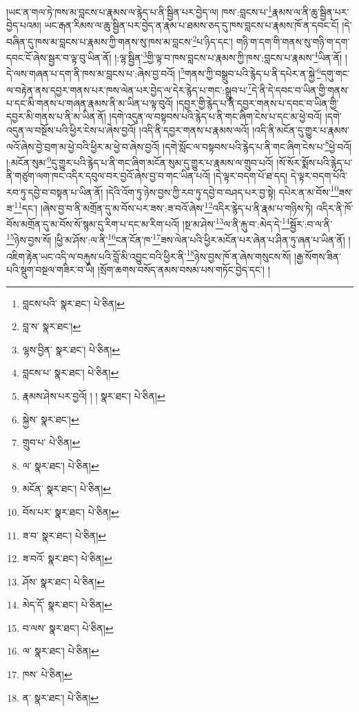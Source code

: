 །ཡང་ན་གལ་ཏེ་ཁས་མ་བླངས་པ་རྣམས་ལ་རྙེད་པ་ནི་སྦྱིན་པར་བྱེད་ལ། ཁས་:བླངས་པ་\footnote{བླངས་པའི་  སྣར་ཐང་།  པེ་ཅིན། }རྣམས་ལ་ནི་ཆུ་སྦྱིན་པར་བྱེད་པའམ། ཡང་རྒན་རིམས་ལ་ཆུ་སྦྱིན་པར་བྱེད་ན་རྣམ་པ་ཐམས་ཅད་དུ་ཁས་བླངས་པ་རྣམས་ཁོ་ན་དབང་ངོ། །དེ་བཞིན་དུ་ཁས་མ་བླངས་པ་རྣམས་ཀྱི་གནས་སུ་ཁས་མ་བླངས་\footnote{བླ་ས་  སྣར་ཐང་། }པ་ཉིད་དང་། གཉི་ག་དག་གི་གནས་སུ་གཉི་ག་དག་དབང་ངོ་ཞེས་སྦྱར་བ་ལྟ་བུ་ཡིན་ནོ། །:ལྷ་སྦྱིན་\footnote{ལྷས་བྱིན་  སྣར་ཐང་།  པེ་ཅིན། }གྱི་ལྟ་བ་ཁས་བླངས་པ་རྣམས་ཀྱི་ཁས་:བླངས་པ་རྣམས་\footnote{བླངས་པ་  སྣར་ཐང་།  པེ་ཅིན། }ཡིན་ནོ། །དེ་ལས་གཞན་པ་དག་ནི་ཁས་མ་བླངས་པ་:ཞེས་བྱ་བའོ། །\footnote{རྣམས་ཤེས་པར་བྱའོ། ། །  སྣར་ཐང་།  པེ་ཅིན། }གནས་ཀྱི་བསྒྲུབ་པའི་རྙེད་པ་ནི་དཔེར་ན་སྐྱེ་\footnote{སྐྱེས་  སྣར་ཐང་། }དགུ་གང་ལ་བརྟེན་ནས་དབྱར་གནས་པར་ཁས་ལེན་པར་བྱེད་ལ་དེར་རྙེད་པ་གང་:སྒྲུབ་པ་\footnote{གྲུབ་པ་  པེ་ཅིན། }དེ་ནི་དེ་དབང་བ་ཡིན་གྱི་གནས་པ་དང་མི་གནས་པ་གཞན་རྣམས་ནི་མ་ཡིན་པ་ལྟ་བུའོ། །དབྱར་གྱི་རྙེད་པ་ནི་དབྱར་གནས་པ་དབང་བ་ཡིན་གྱི་དབྱར་མི་གནས་པ་ནི་མ་ཡིན་ནོ། །དགེ་འདུན་ལ་བསྟབས་པའི་རྙེད་པ་ནི་གང་ཞིག་ངེས་པ་དང་མ་ཕྱེ་བའོ། །དགེ་འདུན་ལ་བསྔོས་པའི་ཕྱིར་ངེས་པ་ཞེས་བྱའོ། །འདི་ནི་དབྱར་གནས་པ་རྣམས་ལའོ། །འདི་ནི་མངོན་དུ་གྱུར་པ་རྣམས་ལའོ་ཞེས་བྱེ་བྲག་མ་ཕྱེ་བའི་ཕྱིར་མ་ཕྱེ་བ་ཞེས་བྱའོ། །དགེ་སློང་ལ་བསྟབས་པའི་རྙེད་པ་ནི་གང་ཞིག་ངེས་པ་\footnote{ལ་  སྣར་ཐང་།  པེ་ཅིན། }ཕྱེ་བའོ། །:མངོན་སུམ་\footnote{མངོན་  སྣར་ཐང་།  པེ་ཅིན། }དུ་གྱུར་པའི་རྙེད་པ་ནི་གང་ཞིག་མངོན་སུམ་དུ་གྱུར་པ་རྣམས་ལ་གྲུབ་པའོ། །སོ་སོར་སྨོས་པའི་རྙེད་པ་ནི་གཙུག་ལག་ཁང་འདིར་དབུལ་བར་བྱའོ་ཞེས་བྱ་བ་གང་ཡིན་པའོ། །དེ་ལྟར་བདག་པོ་ཐ་དད། དེ་ལྟར་བདག་པོའི་རབ་ཏུ་དབྱེ་བ་བསྟན་པ་ཡིན་ནོ། །དེའི་འོག་ཏུ་ཉེས་བྱས་ཀྱི་རབ་ཏུ་དབྱེ་བ་བཤད་པར་བྱ་སྟེ། དཔེར་ན་མ་བོས་\footnote{བོས་པར་  སྣར་ཐང་།  པེ་ཅིན། }ཟས་ཟ་\footnote{ཟ་བ་  སྣར་ཐང་།  པེ་ཅིན། }དང་། །ཞེས་བྱ་བ་ནི་མགྲོན་དུ་མ་བོས་པར་ཟས་:ཟ་བའོ་ཞེས་\footnote{ཟ་བའོ་  སྣར་ཐང་།  པེ་ཅིན། }འདིར་རྙེད་པ་ནི་རྣམ་པ་གཉིས་ཏེ། འདིར་ནི་ཁོ་བོས་མགྲོན་དུ་མ་བོས་སོ་སྙམ་དུ་རིག་པ་དང་མ་རིག་པའོ། །སྔ་མ་ཤེས་\footnote{ཤོས་  སྣར་ཐང་།  པེ་ཅིན། }ལ་ནི་རྐུ་བ་:མེད་དེ་\footnote{མེད་དོ་  སྣར་ཐང་།  པེ་ཅིན། }སྦྱོར་:བ་ལ་ནི་\footnote{བ་ལས་  སྣར་ཐང་།  པེ་ཅིན། }ཉེས་བྱས་སོ། །ཕྱི་མ་ཤོས་:ལ་ནི་\footnote{ལ་  སྣར་ཐང་།  པེ་ཅིན། }ངན་ངོན་ཁ་\footnote{ཁས་  པེ་ཅིན། }ཟས་ལེན་པའི་ཕྱིར་མངོན་པར་ཞེན་པ་ཤིན་ཏུ་ཞན་པ་ཡིན་ནོ། །འཇིག་རྟེན་ཡང་འདི་ལ་བརྐུས་པའི་བློ་མི་འབྱུང་བའི་ཕྱིར་ནི་\footnote{ན་  སྣར་ཐང་།  པེ་ཅིན། }ཉེས་བྱས་ཁོ་ན་ཞེས་གསུངས་སོ། །རྒྱ་སོགས་ཟིན་པའི་སྡུག་བསྔལ་གཟིར་བ་ཡི། །སྲོག་ཆགས་བསོད་ནམས་བསམ་པས་གཏོང་བྱེད་དང་། །
